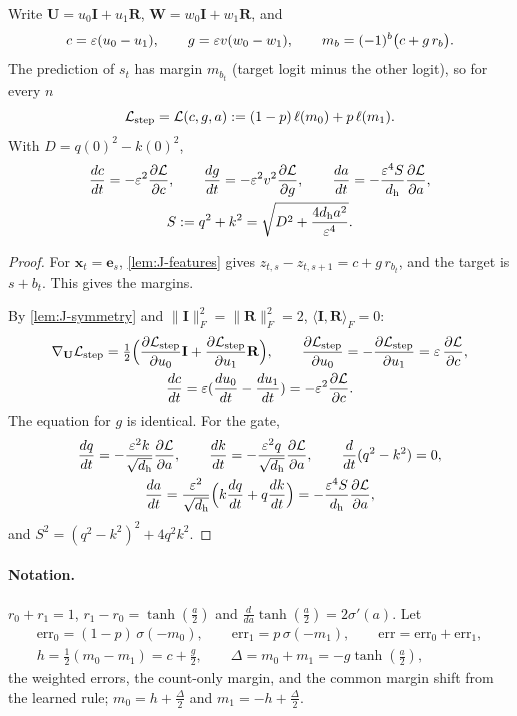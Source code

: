\begin{lemma}
\label{lem:J-reduce}
Write $\mathbf U=u_0\mathbf I+u_1\mathbf R$, $\mathbf W=w_0\mathbf I+w_1\mathbf R$, and
\[
 c=\varepsilon(u_0-u_1),\qquad g=\varepsilon v(w_0-w_1),\qquad m_b=(-1)^b\bigl(c+g\,r_b\bigr).
\]
The prediction of $s_t$ has margin $m_{b_t}$ (target logit minus the other logit), so for every $n$
\[
 \mathcal L_{\mathrm{step}}=\mathcal L(c,g,a):=(1-p)\,\ell(m_0)+p\,\ell(m_1).
\]
With $D=q(0)^2-k(0)^2$,
\begin{equation}
 \begin{gathered}
 \ddt{c}=-\initscale^2\pd{\mathcal L}{c},\qquad \ddt{g}=-\initscale^2v^2\pd{\mathcal L}{g},\qquad \ddt{a}=-\frac{\initscale^4S}{d_{\mathrm h}}\pd{\mathcal L}{a},\\
 S:=q^2+k^2=\sqrt{D^2+\frac{4d_{\mathrm h}a^2}{\initscale^4}}.
 \end{gathered}
 \label{eq:J-flow}
\end{equation}
\end{lemma}

\begin{proof}
For $\bm x_t=\bm e_s$, \cref{lem:J-features} gives $z_{t,s}-z_{t,s+1}=c+g\,r_{b_t}$, and the target is $s+b_t$. This gives the margins.

By \cref{lem:J-symmetry} and $\|\mathbf I\|_F^2=\|\mathbf R\|_F^2=2$, $\langle\mathbf I,\mathbf R\rangle_F=0$:
\begin{gather*}
 \nabla_{\mathbf U}\Lstep=\tfrac{1}{2}\Bigl(\pd{\Lstep}{u_0}\mathbf I+\pd{\Lstep}{u_1}\mathbf R\Bigr),\qquad \pd{\Lstep}{u_0}=-\pd{\Lstep}{u_1}=\initscale\, \pd{\mathcal L}{c},\\
 \ddt{c}=\initscale(\ddt{u_0}-\ddt{u_1})=-\initscale^2 \pd{\mathcal L}{c} .
\end{gather*}
The equation for $g$ is identical. For the gate,
\begin{gather*}
 \ddt{q}=-\frac{\initscale^2k}{\sqrt{d_{\mathrm h}}}\pd{\mathcal L}{a},\qquad \ddt{k}=-\frac{\initscale^2q}{\sqrt{d_{\mathrm h}}}\pd{\mathcal L}{a},\qquad \frac{d}{dt}(q^2-k^2)=0,\\
 \ddt{a}=\frac{\initscale^2}{\sqrt{d_{\mathrm h}}}\Bigl(k\ddt{q}+q\ddt{k}\Bigr)=-\frac{\initscale^4S}{d_{\mathrm h}}\pd{\mathcal L}{a},
\end{gather*}
and $S^2=(q^2-k^2)^2+4q^2k^2$.
\end{proof}

\paragraph{Notation.} $r_0+r_1=1$, $r_1-r_0=\tanh(\frac{a}{2})$ and $\frac{d}{da}\tanh(\frac{a}{2})=2\sigma'(a)$. Let
\begin{gather*}
 \mathrm{err}_0=(1-p)\,\sigma(-m_0),\qquad \mathrm{err}_1=p\,\sigma(-m_1),\qquad \mathrm{err}=\mathrm{err}_0+\mathrm{err}_1,\\
 h=\tfrac{1}{2}(m_0-m_1)=c+\tfrac{g}{2},\qquad \Delta=m_0+m_1=-g\tanh(\frac{a}{2}),
\end{gather*}
the weighted errors, the count-only margin, and the common margin shift from the learned rule; $m_0=h+\frac{\Delta}{2}$ and
$m_1=-h+\frac{\Delta}{2}$.

